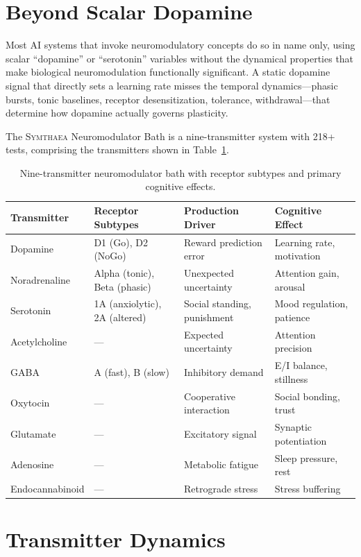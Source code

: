 \documentclass[12pt]{book}
\newcommand{\symthaea}{\textsc{Symthaea}}
\begin{document}
\section{Beyond Scalar Dopamine}

Most AI systems that invoke neuromodulatory concepts do so in name only, using scalar ``dopamine'' or ``serotonin'' variables without the dynamical properties that make biological neuromodulation functionally significant. A static dopamine signal that directly sets a learning rate misses the temporal dynamics---phasic bursts, tonic baselines, receptor desensitization, tolerance, withdrawal---that determine how dopamine actually governs plasticity.

The \symthaea{} Neuromodulator Bath is a nine-transmitter system with 218+ tests, comprising the transmitters shown in Table~\ref{tab:transmitters}.

\begin{table}[H]
\centering
\caption{Nine-transmitter neuromodulator bath with receptor subtypes and primary cognitive effects.}
\label{tab:transmitters}
\begin{tabular}{llll}
\toprule
\textbf{Transmitter} & \textbf{Receptor Subtypes} & \textbf{Production Driver} & \textbf{Cognitive Effect} \\
\midrule
Dopamine & D1 (Go), D2 (NoGo) & Reward prediction error & Learning rate, motivation \\
Noradrenaline & Alpha (tonic), Beta (phasic) & Unexpected uncertainty & Attention gain, arousal \\
Serotonin & 1A (anxiolytic), 2A (altered) & Social standing, punishment & Mood regulation, patience \\
Acetylcholine & --- & Expected uncertainty & Attention precision \\
GABA & A (fast), B (slow) & Inhibitory demand & E/I balance, stillness \\
Oxytocin & --- & Cooperative interaction & Social bonding, trust \\
Glutamate & --- & Excitatory signal & Synaptic potentiation \\
Adenosine & --- & Metabolic fatigue & Sleep pressure, rest \\
Endocannabinoid & --- & Retrograde stress & Stress buffering \\
\bottomrule
\end{tabular}
\end{table}

\section{Transmitter Dynamics}
\end{document}
